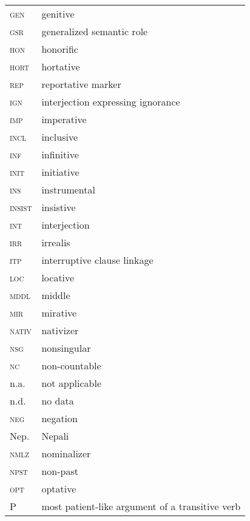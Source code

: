 \begin{multicols}{2}
\begin{tabular}{lp{4.5cm}} 
\textsc{gen} &   genitive\\
\textsc{gsr} &   generalized semantic role\\
\textsc{hon} &  honorific\\
\textsc{hort} &   hortative\\
\textsc{rep} &  reportative marker\\
\textsc{ign} &   interjection expressing ignorance\\
\textsc{imp} &   imperative\\
\textsc{incl} &  inclusive\\
\textsc{inf} &   infinitive\\
\textsc{init} &   initiative\\
\textsc{ins} &   instrumental\\
\textsc{insist} &   insistive\\
\textsc{int} &   interjection\\
\textsc{irr} &  irrealis\\
\textsc{itp} &   interruptive clause linkage\\
\textsc{loc} &  	  locative \\
\textsc{mddl} &  middle\\
\textsc{mir} &   mirative\\
\textsc{nativ} &  nativizer\\
\textsc{nsg} &  		 nonsingular\\ 
\textsc{nc} &  non-countable\\
n.a. & not applicable\\
n.d. & no data\\
\textsc{neg} &  	negation\\
Nep. 	& Nepali\\
\textsc{nmlz} &  	nominalizer\\
\textsc{npst} &   non-past\\
\textsc{opt} &   optative\\
P &	 most patient-like argument of a transitive verb\\
\end{tabular}


\end{multicols}
